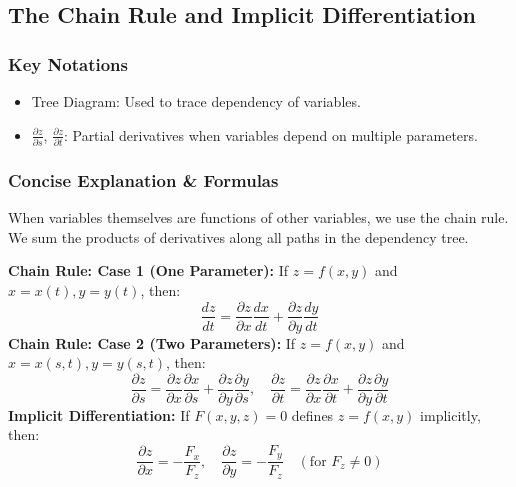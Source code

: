 \documentclass[11pt]{article}
\begin{document}
\subsection{The Chain Rule and Implicit Differentiation}
\subsubsection*{Key Notations}
\begin{itemize}
    \item Tree Diagram: Used to trace dependency of variables.
    \item $\frac{\partial z}{\partial s}$, $\frac{\partial z}{\partial t}$: Partial derivatives when variables depend on multiple parameters.
\end{itemize}

\subsubsection*{Concise Explanation \& Formulas}
When variables themselves are functions of other variables, we use the chain rule. We sum the products of derivatives along all paths in the dependency tree.
\begin{formulabox}
    \textbf{Chain Rule: Case 1 (One Parameter):} If $z = f(x,y)$ and $x=x(t), y=y(t)$, then:
    \[ \frac{dz}{dt} = \frac{\partial z}{\partial x}\frac{dx}{dt} + \frac{\partial z}{\partial y}\frac{dy}{dt} \]
    \textbf{Chain Rule: Case 2 (Two Parameters):} If $z = f(x,y)$ and $x=x(s,t), y=y(s,t)$, then:
    \[ \frac{\partial z}{\partial s} = \frac{\partial z}{\partial x}\frac{\partial x}{\partial s} + \frac{\partial z}{\partial y}\frac{\partial y}{\partial s}, \quad \frac{\partial z}{\partial t} = \frac{\partial z}{\partial x}\frac{\partial x}{\partial t} + \frac{\partial z}{\partial y}\frac{\partial y}{\partial t} \]
    \textbf{Implicit Differentiation:} If $F(x,y,z) = 0$ defines $z = f(x,y)$ implicitly, then:
    \[ \frac{\partial z}{\partial x} = -\frac{F_x}{F_z}, \quad \frac{\partial z}{\partial y} = -\frac{F_y}{F_z} \quad (\text{for } F_z \neq 0) \]
\end{formulabox}
\end{document}
